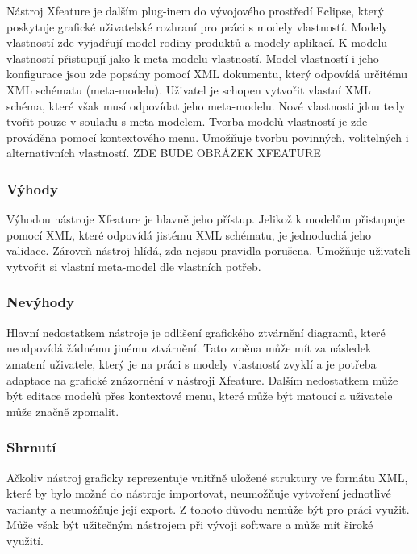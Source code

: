 Nástroj Xfeature je dalším plug-inem do vývojového prostředí Eclipse, který poskytuje grafické uživatelské rozhraní pro práci s modely vlastností. Modely vlastností zde vyjadřují model rodiny produktů a modely aplikací. K modelu vlastností přistupují jako k meta-modelu vlastností. Model vlastností i jeho konfigurace jsou zde popsány pomocí XML dokumentu, který odpovídá určitému XML schématu (meta-modelu). Uživatel je schopen vytvořit vlastní XML schéma, které však musí odpovídat jeho meta-modelu. Nové vlastnosti jdou tedy tvořit pouze v souladu s meta-modelem. Tvorba modelů vlastností je zde prováděna pomocí kontextového menu. Umožňuje tvorbu povinných, volitelných i alternativních vlastností.
\newline
\newline
ZDE BUDE OBRÁZEK XFEATURE
\newline
\newline

\subsubsection{Výhody}
Výhodou nástroje Xfeature je hlavně jeho přístup. Jelikož k modelům přistupuje pomocí XML, které odpovídá jistému XML schématu, je jednoduchá jeho validace. Zároveň nástroj hlídá, zda nejsou pravidla porušena. Umožňuje uživateli vytvořit si vlastní meta-model dle vlastních potřeb.

\subsubsection{Nevýhody}
Hlavní nedostatkem nástroje je odlišení grafického ztvárnění diagramů, které neodpovídá žádnému jinému ztvárnění. Tato změna může mít za následek zmatení uživatele, který je na práci s modely vlastností zvyklí a je potřeba adaptace na grafické znázornění v nástroji Xfeature. Dalším nedostatkem může být editace modelů přes kontextové menu, které může být matoucí a uživatele může značně zpomalit.

\subsubsection{Shrnutí}
Ačkoliv nástroj graficky reprezentuje vnitřně uložené struktury ve formátu XML, které by bylo možné do nástroje importovat, neumožňuje vytvoření jednotlivé varianty a neumožňuje její export. Z tohoto důvodu nemůže být pro práci využit. Může však být užitečným nástrojem při vývoji software a může mít široké využití.

